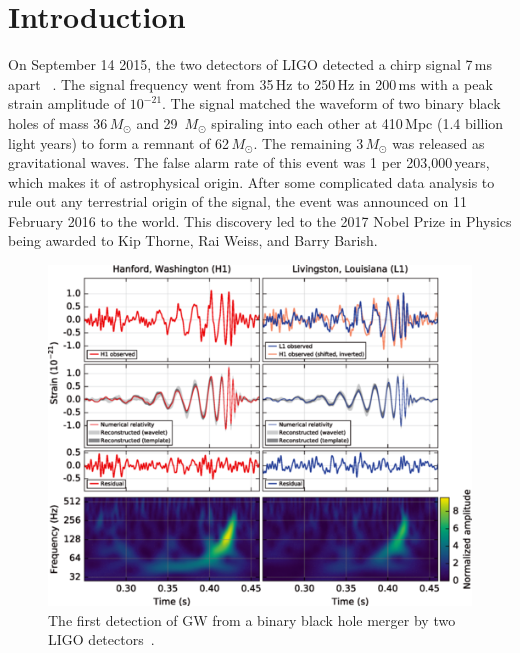 \documentclass{ttuthes2007}
\begin{document}

\mainmatter


\chapter{\textbf{Introduction}}
    On September 14 2015, the two detectors of \ac{LIGO} detected a chirp signal
7\,ms apart ~\cite{Abbott_2016}. The signal frequency went from 35\,Hz to
250\,Hz in 200\,ms with a peak strain amplitude of $10^{-21}$.  The signal
matched the waveform of two binary black holes of mass 36\,$M_\odot$ and 29\,
$M_\odot$ spiraling into each other at 410\,Mpc (1.4 billion light years) to
form a remnant of 62\,$M_\odot$. The remaining 3\,$M_\odot$ was released as
gravitational waves. The false alarm rate of this event was 1 per
203,000\,years, which makes it of astrophysical origin. After some complicated
data analysis to rule out any terrestrial origin of the signal, the event was
announced on 11 February 2016 to the world. This discovery led to the 2017 Nobel
Prize in Physics being awarded to Kip Thorne, Rai Weiss, and Barry Barish.
\begin{figure}[bht!]                                                              
        \includegraphics[width=\textwidth]{figure/BBH.png}                          
	\caption{The first detection of \ac{GW} from a binary black hole
merger by two \ac{LIGO} detectors~\cite{Abbott_2016}.}
\end{figure}      
\end{document}
